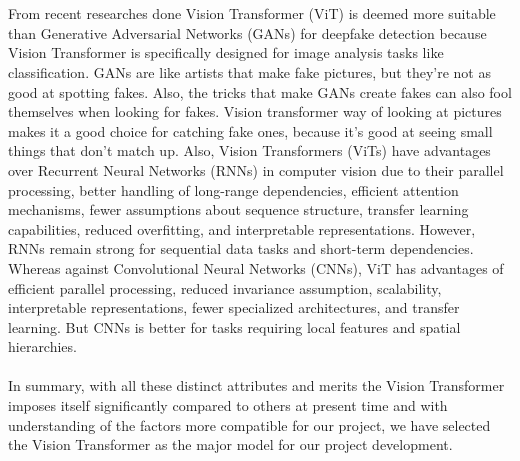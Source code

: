 \\\\
From recent researches done Vision Transformer (ViT) is deemed more suitable than Generative Adversarial Networks (GANs) for deepfake detection because Vision Transformer is specifically designed for image analysis tasks like classification. GANs are like artists that make fake pictures, but they're not as good at spotting fakes. Also, the tricks that make GANs create fakes can also fool themselves when looking for fakes. Vision transformer way of looking at pictures makes it a good choice for catching fake ones, because it's good at seeing small things that don't match up. Also, Vision Transformers (ViTs) have advantages over Recurrent Neural Networks (RNNs) in computer vision due to their parallel processing, better handling of long-range dependencies, efficient attention mechanisms, fewer assumptions about sequence structure, transfer learning capabilities, reduced overfitting, and interpretable representations. However, RNNs remain strong for sequential data tasks and short-term dependencies. Whereas against Convolutional Neural Networks (CNNs), ViT has advantages of efficient parallel processing, reduced invariance assumption, scalability, interpretable representations, fewer specialized architectures, and transfer learning. But CNNs is better for tasks requiring local features and spatial hierarchies.
\\\\
In summary, with all these distinct attributes and merits the Vision Transformer imposes itself significantly compared to others at present time and with understanding of the factors more compatible for our project, we have selected the Vision Transformer as the major model for our project development.

